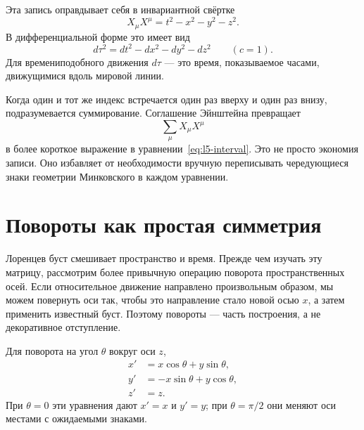 Эта запись оправдывает себя в инвариантной свёртке
\begin{equation}
X_\mu X^\mu=t^2-x^2-y^2-z^2.
\label{eq:l5-interval}
\end{equation}
В дифференциальной форме это имеет вид
\begin{equation}
d\tau^2=dt^2-dx^2-dy^2-dz^2
\qquad (c=1).
\label{eq:l5-proper-time}
\end{equation}
Для времениподобного движения \(d\tau\) — это время, показываемое часами, движущимися вдоль мировой линии.

Когда один и тот же индекс встречается один раз вверху и один раз внизу, подразумевается суммирование. Соглашение Эйнштейна превращает
\begin{equation}
\sum_{\mu}X_\mu X^\mu
\end{equation}
в более короткое выражение в уравнении~\eqref{eq:l5-interval}. Это не просто экономия записи. Оно избавляет от необходимости вручную переписывать чередующиеся знаки геометрии Минковского в каждом уравнении.

\begin{classroomqa}
\end{classroomqa}

\section{Повороты как простая симметрия}

Лоренцев буст смешивает пространство и время. Прежде чем изучать эту матрицу, рассмотрим более привычную операцию поворота пространственных осей. Если относительное движение направлено произвольным образом, мы можем повернуть оси так, чтобы это направление стало новой осью \(x\), а затем применить известный буст. Поэтому повороты — часть построения, а не декоративное отступление.

Для поворота на угол \(\theta\) вокруг оси \(z\),
\begin{align}
x'&=x\cos\theta+y\sin\theta,\nonumber\\
y'&=-x\sin\theta+y\cos\theta,\label{eq:l5-rotation}\\
z'&=z.\nonumber
\end{align}
При \(\theta=0\) эти уравнения дают \(x'=x\) и \(y'=y\); при \(\theta=\pi/2\) они меняют оси местами с ожидаемыми знаками.

